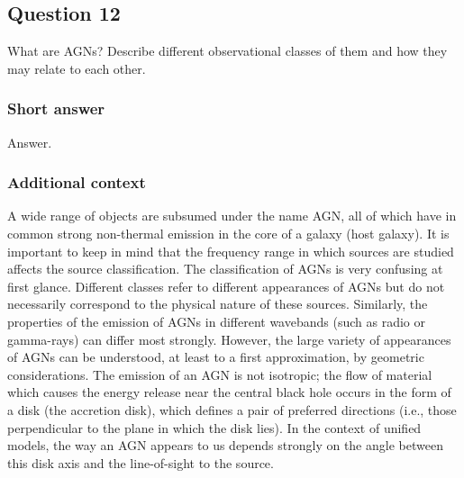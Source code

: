 \documentclass[a4paper,11pt]{article}
\begin{document}

\newpage
\subsection{Question 12}

What are AGNs? Describe different observational classes of them and how they may relate to each other.

\subsubsection{Short answer}

Answer.

\subsubsection{Additional context}

A wide range of objects are subsumed under the name AGN, all of which have in common strong non-thermal emission in the core of a galaxy (host galaxy). It is important to keep in mind that the frequency range in which sources are studied affects the source classification. The classification of AGNs is very confusing at first glance. Different classes refer to different appearances of AGNs but do not necessarily correspond to the physical nature of these sources. Similarly, the properties of the emission of AGNs in different wavebands (such as radio or gamma-rays) can differ most strongly. However, the large variety of appearances of AGNs can be understood, at least to a first approximation, by geometric considerations. The emission of an AGN is not isotropic; the flow of material which causes the energy release near the central black hole occurs in the form of a disk (the accretion disk), which defines a pair of preferred directions (i.e., those perpendicular to the plane in which the disk lies). In the context of unified models, the way an AGN appears to us depends strongly on the angle between this disk axis and the line-of-sight to the source.
\end{document}
